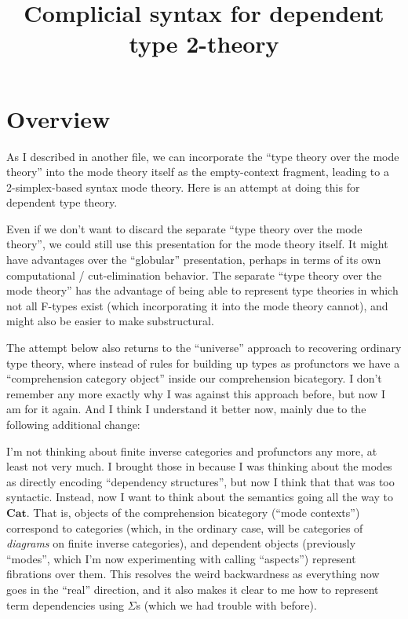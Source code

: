 \documentclass[10pt]{article}
\title{Complicial syntax for dependent type 2-theory}
\author{}
\date{}
\begin{document}
\maketitle

\section{Overview}
\label{sec:overview}

As I described in another file, we can incorporate the ``type theory over the mode theory'' into the mode theory itself as the empty-context fragment, leading to a 2-simplex-based syntax mode theory.
Here is an attempt at doing this for dependent type theory.

Even if we don't want to discard the separate ``type theory over the mode theory'', we could still use this presentation for the mode theory itself.
It might have advantages over the ``globular'' presentation, perhaps in terms of its own computational / cut-elimination behavior.
The separate ``type theory over the mode theory'' has the advantage of being able to represent type theories in which not all \textsf{F}-types exist (which incorporating it into the mode theory cannot), and might also be easier to make substructural.

The attempt below also returns to the ``universe'' approach to recovering ordinary type theory, where instead of rules for building up types as profunctors we have a ``comprehension category object'' inside our comprehension bicategory.
I don't remember any more exactly why I was against this approach before, but now I am for it again.
And I think I understand it better now, mainly due to the following additional change:

I'm not thinking about finite inverse categories and profunctors any more, at least not very much.
I brought those in because I was thinking about the modes as directly encoding ``dependency structures'', but now I think that that was too syntactic.
Instead, now I want to think about the semantics going all the way to $\mathbf{Cat}$.
That is, objects of the comprehension bicategory (``mode contexts'') correspond to categories (which, in the ordinary case, will be categories of \emph{diagrams} on finite inverse categories), and dependent objects (previously ``modes'', which I'm now experimenting with calling ``aspects'') represent fibrations over them.
This resolves the weird backwardness as everything now goes in the ``real'' direction, and it also makes it clear to me how to represent term dependencies using $\Sigma$s (which we had trouble with before).
\end{document}
